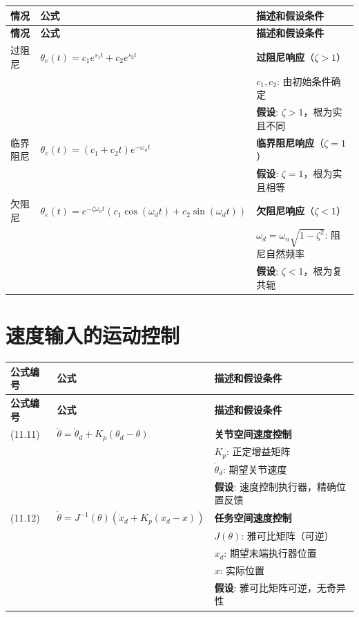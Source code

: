 \documentclass[12pt,a4paper]{article}
\begin{document}
\begin{longtable}{|p{}|p{}|p{}|}
\hline
\textbf{情况} & \textbf{公式} & \textbf{描述和假设条件} \\
\hline
\endfirsthead
\hline
\textbf{情况} & \textbf{公式} & \textbf{描述和假设条件} \\
\hline
\endhead
\hline
\endfoot
\hline
\endlastfoot

过阻尼 & $\theta_e(t) = c_1 e^{s_1 t} + c_2 e^{s_2 t}$ & 
\textbf{过阻尼响应}（$\zeta > 1$） \\
& & $c_1, c_2$: 由初始条件确定 \\
& & \textbf{假设}: $\zeta > 1$，根为实且不同 \\
\hline

临界阻尼 & $\theta_e(t) = (c_1 + c_2 t)e^{-\omega_n t}$ & 
\textbf{临界阻尼响应}（$\zeta = 1$） \\
& & \textbf{假设}: $\zeta = 1$，根为实且相等 \\
\hline

欠阻尼 & $\theta_e(t) = e^{-\zeta\omega_n t}(c_1 \cos(\omega_d t) + c_2 \sin(\omega_d t))$ & 
\textbf{欠阻尼响应}（$\zeta < 1$） \\
& & $\omega_d = \omega_n\sqrt{1 - \zeta^2}$: 阻尼自然频率 \\
& & \textbf{假设}: $\zeta < 1$，根为复共轭 \\
\hline

\end{longtable}

\section{速度输入的运动控制}

\begin{longtable}{|p{}|p{}|p{}|}
\hline
\textbf{公式编号} & \textbf{公式} & \textbf{描述和假设条件} \\
\hline
\endfirsthead
\hline
\textbf{公式编号} & \textbf{公式} & \textbf{描述和假设条件} \\
\hline
\endhead
\hline
\endfoot
\hline
\endlastfoot

(11.11) & $\dot{\theta} = \dot{\theta}_d + K_p(\theta_d - \theta)$ & 
\textbf{关节空间速度控制} \\
& & $K_p$: 正定增益矩阵 \\
& & $\dot{\theta}_d$: 期望关节速度 \\
& & \textbf{假设}: 速度控制执行器，精确位置反馈 \\
\hline

(11.12) & $\dot{\theta} = J^{-1}(\theta)\left(\dot{x}_d + K_p(x_d - x)\right)$ & 
\textbf{任务空间速度控制} \\
& & $J(\theta)$: 雅可比矩阵（可逆） \\
& & $x_d$: 期望末端执行器位置 \\
& & $x$: 实际位置 \\
& & \textbf{假设}: 雅可比矩阵可逆，无奇异性 \\
\hline

\end{longtable}
\end{document}
